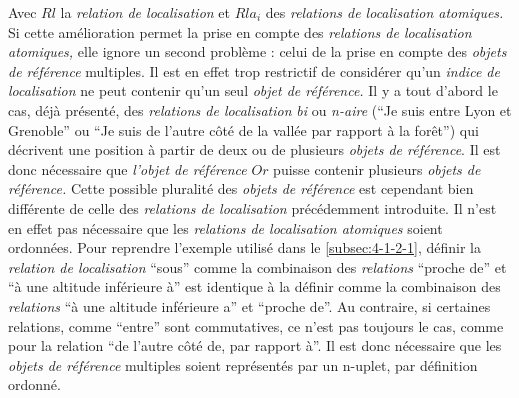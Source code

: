 Avec \(Rl\) la \emph{relation de localisation} et \(Rla_i\) des
\emph{relations de localisation atomiques.} Si cette amélioration
permet la prise en compte des \emph{relations de localisation
  atomiques,} elle ignore un second problème : celui de la prise en
compte des \emph{objets de référence} multiples. Il est en effet trop
restrictif de considérer qu'un \emph{indice de localisation} ne peut
contenir qu'un seul \emph{objet de référence.}  Il y a tout d'abord le
cas, déjà présenté, des \emph{relations de localisation} \emph{bi} ou
\emph{n-aire} (\eg \enquote{Je suis entre Lyon et Grenoble} ou
\enquote{Je suis de l'autre côté de la vallée par rapport à la forêt})
qui décrivent une position à partir de deux ou de plusieurs
\emph{objets de référence}. Il est donc nécessaire que \emph{l'objet
  de référence} \(Or\) puisse contenir plusieurs \emph{objets de
  référence.} Cette possible pluralité des \emph{objets de référence}
est cependant bien différente de celle des \emph{relations de
  localisation} précédemment introduite. Il n'est en effet pas
nécessaire que les \emph{relations de localisation atomiques} soient
ordonnées. Pour reprendre l'exemple utilisé dans le
\ref{subsec:4-1-2-1}, définir la \emph{relation de localisation}
\enquote{sous} comme la combinaison des \emph{relations}
\enquote{proche de} et \enquote{à une altitude inférieure à} est
identique à la définir comme la combinaison des \emph{relations}
\enquote{à une altitude inférieure a} et \enquote{proche de}. Au
contraire, si certaines relations, comme \enquote{entre} sont
commutatives, ce n'est pas toujours le cas, comme pour la relation
\enquote{de l'autre côté de, par rapport à}. Il est donc nécessaire
que les \emph{objets de référence} multiples soient représentés par un
n-uplet, par définition ordonné.

